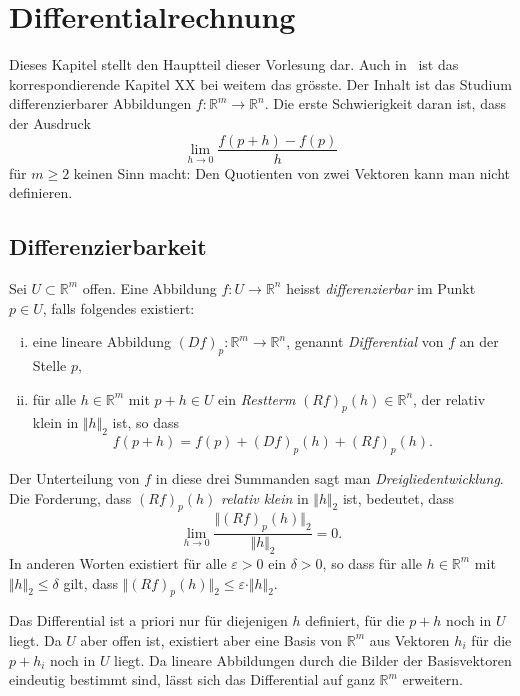 \documentclass[../main.tex]{subfiles}
\begin{document}
\chapter{Differentialrechnung}\label{chp:differential}
Dieses Kapitel stellt den Hauptteil dieser Vorlesung dar.
Auch in~\cite{heuser} ist das korrespondierende
Kapitel XX bei weitem das grösste. Der Inhalt ist das
Studium differenzierbarer Abbildungen 
$f \colon \mathbb{R}^m \to \mathbb{R}^n$.
Die erste Schwierigkeit daran ist, dass der Ausdruck
\[
  \lim_{h \to 0} \frac{f(p + h) - f(p)}{h}
\]
für $m \geq 2$ keinen Sinn macht: Den 
Quotienten von zwei Vektoren kann man nicht
definieren.

\section{Differenzierbarkeit}
\begin{definition}
  Sei $U \subset \mathbb{R}^m$ offen. Eine Abbildung
  $f \colon U \to \mathbb{R}^n$ heisst
  \emph{differenzierbar} im Punkt $p \in U$, falls
  folgendes existiert:
  \begin{enumerate}[(i)]
    \item eine lineare Abbildung 
      ${(Df)}_p \colon \mathbb{R}^m \to \mathbb{R}^n$,
      genannt \emph{Differential} von $f$ an
      der Stelle $p$,
    \item für alle $h \in \mathbb{R}^m$ mit $p + h \in U$ 
      ein \emph{Restterm} ${(Rf)}_p(h) \in \mathbb{R}^n$,
      der relativ klein in $\Vert h \Vert_2$ ist,
      so dass
      \[
        f(p+h) = f(p) + {(Df)}_p(h) + {(Rf)}_p(h).
      \]
  \end{enumerate}
  Der Unterteilung von $f$ in diese drei Summanden sagt man
  \emph{Dreigliedentwicklung}. Die Forderung,
  dass ${(Rf)}_p(h)$ \emph{relativ klein} in $\Vert h \Vert_2$ 
  ist, bedeutet, dass
  \[
    \lim_{h \to 0} \frac{\Vert {(Rf)}_p(h)\Vert_2}{\Vert h \Vert_2}
    = 0.
  \]
  In anderen Worten existiert für alle $\varepsilon > 0$ ein $\delta > 0 $,
  so dass für alle $h \in \mathbb{R}^m$ mit $\Vert h \Vert_2
  \leq \delta$ gilt, dass $\Vert {(Rf)}_p(h) \Vert_2
  \leq \varepsilon \cdot \Vert h \Vert_2$.
\end{definition}

\begin{remark}
  Das Differential ist a priori nur für diejenigen
  $h$ definiert, für die $p + h$ noch in $U$ 
  liegt. Da $U$ aber offen ist, existiert aber
  eine Basis von $\mathbb{R}^m$ aus Vektoren
  $h_i$ für die $p + h_i$ noch in $U$ liegt.
  Da lineare Abbildungen durch die Bilder der
  Basisvektoren eindeutig bestimmt sind, lässt
  sich das Differential auf ganz $\mathbb{R}^m$
  erweitern.
\end{remark}
\end{document}
